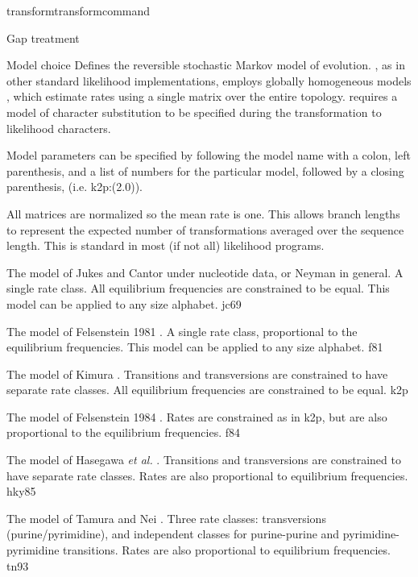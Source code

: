 \begin{command}{transform}{transformcommand}
\begin{arguments}
\begin {argumentgroup} {Gap treatment}
\end {argumentgroup}             


\begin {argumentgroup} {Model choice}
Defines the reversible stochastic Markov model of evolution.
\poy, as in other standard likelihood implementations,
employs globally homogeneous models \cite{jayaswal2005estimation}, which
estimate rates using a single matrix over the entire topology.
\poy requires a model of character substitution to be specified
during the transformation to likelihood characters.

Model parameters can be specified by following
the model name with a colon, left parenthesis, and a list of
numbers for the particular model, followed by a closing
parenthesis, (i.e. k2p:(2.0)).

\begin{statement}
All matrices are normalized so the mean rate is one. This
allows branch lengths to represent the expected number of
transformations averaged over the sequence length. This is
standard in most (if not all) likelihood programs.
\end{statement}

{The model of Jukes and Cantor \cite{jukesandcantor1969}
under nucleotide data, or Neyman \cite{neyman1971} in general. A
single rate class. All equilibrium frequencies are
constrained to be equal. This model can be applied to any size
alphabet.}
{jc69}

{The model of Felsenstein 1981 \cite{felsenstein1981}. A
single rate class, proportional to the equilibrium
frequencies. This model can be applied to any size
alphabet.}
{f81}

{The model of Kimura \cite{kimura1980}. Transitions and
transversions are constrained to have separate rate
classes. All equilibrium frequencies are constrained to be
equal.}
{k2p}

{The model of Felsenstein 1984 \cite{felsenstein1980}. Rates
are constrained as in k2p, but are also proportional to
the equilibrium frequencies.}
{f84}

{The model of Hasegawa \emph{et al.} \cite{hasegawa1984}. 
Transitions and transversions are constrained to have separate rate
classes. Rates are also proportional to equilibrium
frequencies.}
{hky85}

{The model of Tamura and Nei \cite{tamura1993}. Three
rate classes: transversions (purine/pyrimidine), and
independent classes for purine-purine and
pyrimidine-pyrimidine transitions. Rates are also
proportional to equilibrium frequencies.}
{tn93}


\end{argumentgroup}
\end{arguments}
\end{command}
